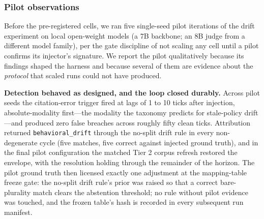 \documentclass[conference]{IEEEtran}
\begin{document}
\subsubsection{Pilot observations}
\label{subsubsec:eval-tau-pilot}

Before the pre-registered cells, we ran five single-seed pilot iterations of the
drift experiment on local open-weight models (a 7B backbone; an 8B judge from a
different model family), per the gate discipline of not scaling any cell until a
pilot confirms its injector's signature. We report the pilot qualitatively
because its findings shaped the harness and because several of them are evidence
about the \emph{protocol} that scaled runs could not have produced.

\textbf{Detection behaved as designed, and the loop closed durably.} Across
pilot seeds the citation-error trigger fired at lags of 1 to 10 ticks after
injection, absolute-modality first---the modality the taxonomy predicts for
stale-policy drift---and produced zero false breaches across roughly fifty
clean ticks. Attribution returned \texttt{behavioral\_drift} through the
no-split drift rule in every non-degenerate cycle (five matches, five correct
against injected ground truth), and in the final pilot configuration the
matched Tier 2 corpus refresh restored the envelope, with the resolution
holding through the remainder of the horizon. The pilot ground truth then
licensed exactly one adjustment at the mapping-table freeze gate: the no-split
drift rule's prior was raised so that a correct bare-plurality match clears
the abstention threshold; no rule without pilot evidence was touched, and the
frozen table's hash is recorded in every subsequent run manifest.
\end{document}
